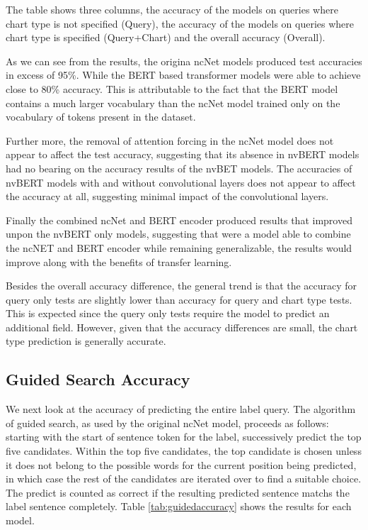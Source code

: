 \documentclass[
	a4paper, %
	10pt, %
	unnumberedsections, %
	twoside, %
]{t0003}
\begin{document}
The table shows three columns, the accuracy of the models on queries where chart type is not specified (Query), the accuracy of the models on queries where chart type is specified (Query+Chart) and the overall accuracy (Overall).

As we can see from the results, the origina ncNet models produced test accuracies in excess of 95\%. While the BERT based transformer models were able to achieve close to 80\% accuracy. This is attributable to the fact that the BERT model contains a much larger vocabulary than the ncNet model trained only on the vocabulary of tokens present in the dataset.

Further more, the removal of attention forcing in the ncNet model does not appear to affect the test accuracy, suggesting that its absence in nvBERT models had no bearing on the accuracy results of the nvBET models. The accuracies of nvBERT models with and without convolutional layers does not appear to affect the accuracy at all, suggesting minimal impact of the convolutional layers.

Finally the combined ncNet and BERT encoder produced results that improved unpon the nvBERT only models, suggesting that were a model able to combine the ncNET and BERT encoder while remaining generalizable, the results would improve along with the benefits of transfer learning.

Besides the overall accuracy difference, the general trend is that the accuracy for query only tests are slightly lower than accuracy for query and chart type tests. This is expected since the query only tests require the model to predict an additional field. However, given that the accuracy differences are small, the chart type prediction is generally accurate.

\subsection{Guided Search Accuracy}

We next look at the accuracy of predicting the entire label query. The algorithm of guided search, as used by the original ncNet model, proceeds as follows: starting with the start of sentence token for the label, successively predict the top five candidates. Within the top five candidates, the top candidate is chosen unless it does not belong to the possible words for the current position being predicted, in which case the rest of the candidates are iterated over to find a suitable choice. The predict is counted as correct if the resulting predicted sentence matchs the label sentence completely. Table \ref{tab:guidedaccuracy} shows the results for each model. 
\end{document}
